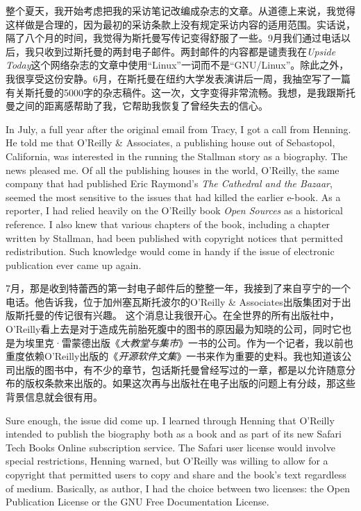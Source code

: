 \ifdefined\chs
整个夏天，我开始考虑把我的采访笔记改编成杂志的文章。从道德上来说，我觉得这样做是合理的，因为最初的采访条款上没有规定采访内容的适用范围。实话说，隔了八个月的时间，我觉得为斯托曼写传记变得舒服了一些。9月我们通过电话以后，我只收到过斯托曼的两封电子邮件。两封邮件的内容都是谴责我在\textit{Upside Today}这个网络杂志的文章中使用``Linux''一词而不是``GNU/Linux''。除此之外，我很享受这份安静。6月，在斯托曼在纽约大学发表演讲后一周，我抽空写了一篇有关斯托曼的5000字的杂志稿件。这一次，文字变得非常流畅。我想，是我跟斯托曼之间的距离感帮助了我，它帮助我恢复了曾经失去的信心。
\fi

\ifdefined\eng
In July, a full year after the original email from Tracy, I got a call from Henning. He told me that O'Reilly \& Associates, a publishing house out of Sebastopol, California, was interested in the running the Stallman story as a biography.
\ifdefined{} 
\fi
The news pleased me. Of all the publishing houses in the world, O'Reilly, the same company that had published Eric Raymond's \textit{The Cathedral and the Bazaar}, seemed the most sensitive to the issues that had killed the earlier e-book. As a reporter, I had relied heavily on the O'Reilly book \textit{Open Sources} as a historical reference. I also knew that various chapters of the book, including a chapter written by Stallman, had been published with \ifdefined\vone copyright \fi\ifdefined\vtwo [license] \fi notices that permitted redistribution. Such knowledge would come in handy if the issue of electronic publication ever came up again.
\fi

\ifdefined\chs
7月，那是收到特蕾西的第一封电子邮件后的整整一年，我接到了来自亨宁的一个电话。他告诉我，位于加州塞瓦斯托波尔的O'Reilly \& Associates出版集团对于出版斯托曼的传记很有兴趣。
\ifdefined\vtwo
\fi
这个消息让我很开心。在全世界的所有出版社中，O'Reilly看上去是对于造成先前胎死腹中的图书的原因最为知晓的公司，同时它也是为埃里克·雷蒙德出版《\textit{大教堂与集市}》一书的公司。作为一个记者，我以前也重度依赖O'Reilly出版的《\textit{开源软件文集}》一书来作为重要的史料。我也知道该公司出版的图书中，有不少的章节，包话斯托曼曾经写过的一章，都是以允许随意分布的版权条款来出版的。如果这次再与出版社在电子出版的问题上有分歧，那这些背景信息就会很有用。
\fi

\ifdefined\eng
Sure enough, the issue did come up. I learned through Henning that O'Reilly intended to publish the biography both as a book and as part of its new Safari Tech Books Online subscription service. The Safari user license would involve special restrictions, Henning warned, but O'Reilly was willing to allow for a copyright that permitted users to copy and share and the book's text regardless of medium. Basically, as author, I had the choice between two licenses: the Open Publication License or the GNU Free Documentation License.
\fi

